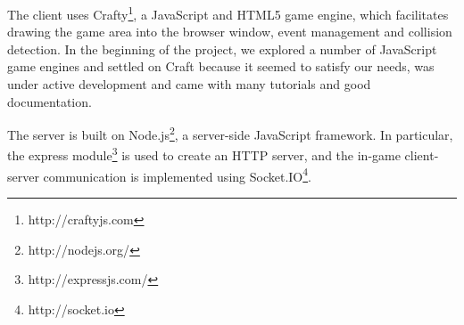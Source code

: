 The client uses Crafty\footnote{http://craftyjs.com}, a JavaScript and
HTML5 game engine, which facilitates drawing the game area into the
browser window, event management and collision detection. In the
beginning of the project, we explored a number of JavaScript game
engines and settled on Craft because it seemed to satisfy our needs,
was under active development and came with many tutorials and good
documentation.



The server is built on Node.js\footnote{http://nodejs.org/}, a
server-side JavaScript framework. In particular, the express
module\footnote{http://expressjs.com/} is used to create an HTTP
server, and the in-game client-server communication is implemented
using Socket.IO\footnote{http://socket.io}.





